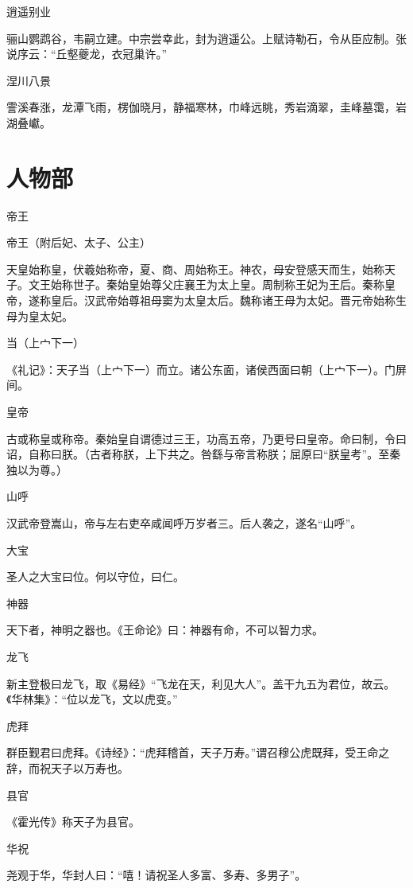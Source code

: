 \documentclass[a4paper,12pt,UTF8,twoside]{ctexbook}
\begin{document}
逍遥别业

骊山鹦鹉谷，韦嗣立建。中宗尝幸此，封为逍遥公。上赋诗勒石，令从臣应制。张说序云：“丘壑夔龙，衣冠巢许。”

涅川八景

霅溪春涨，龙潭飞雨，楞伽晓月，静福寒林，巾峰远眺，秀岩滴翠，圭峰墓霭，岩湖叠巘。



    \part{人物部}
    
    帝王
    
    帝王（附后妃、太子、公主）
    
    天皇始称皇，伏羲始称帝，夏、商、周始称王。神农，母安登感天而生，始称天子。文王始称世子。秦始皇始尊父庄襄王为太上皇。周制称王妃为王后。秦称皇帝，遂称皇后。汉武帝始尊祖母窦为太皇太后。魏称诸王母为太妃。晋元帝始称生母为皇太妃。
    
    当（上宀下一）
    
    《礼记》：天子当（上宀下一）而立。诸公东面，诸侯西面曰朝（上宀下一）。门屏间。
    
    皇帝
    
    古或称皇或称帝。秦始皇自谓德过三王，功高五帝，乃更号曰皇帝。命曰制，令曰诏，自称曰朕。（古者称朕，上下共之。咎繇与帝言称朕；屈原曰“朕皇考”。至秦独以为尊。）
    
    山呼
    
    汉武帝登嵩山，帝与左右吏卒咸闻呼万岁者三。后人袭之，遂名“山呼”。
    
    大宝
    
    圣人之大宝曰位。何以守位，曰仁。
    
    神器
    
    天下者，神明之器也。《王命论》曰：神器有命，不可以智力求。
    
    龙飞
    
    新主登极曰龙飞，取《易经》“飞龙在天，利见大人”。盖干九五为君位，故云。《华林集》：“位以龙飞，文以虎变。”
    
    虎拜
    
    群臣觐君曰虎拜。《诗经》：“虎拜稽首，天子万寿。”谓召穆公虎既拜，受王命之辞，而祝天子以万寿也。
    
    县官
    
    《霍光传》称天子为县官。
    
    华祝
    
    尧观于华，华封人曰：“嘻！请祝圣人多富、多寿、多男子”。
    
\end{document}
